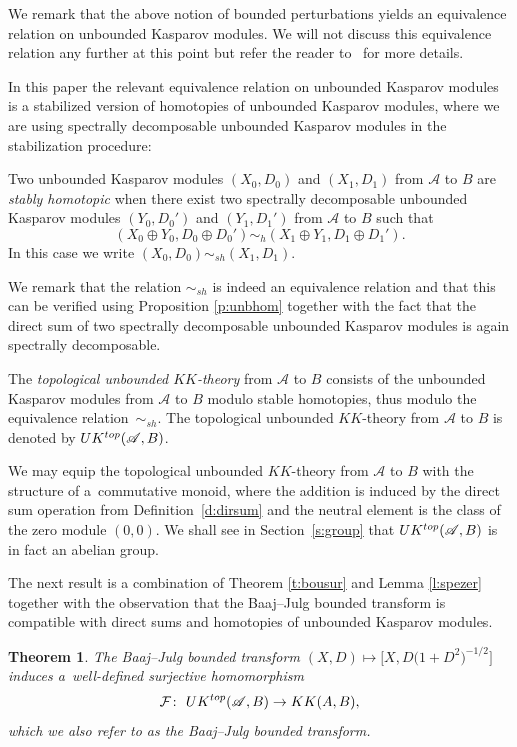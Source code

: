 \documentclass[11pt]{article}
\numberwithin{equation}{section}
\newtheorem{Theorem}{Theorem}[section]
\newcommand{\op}{\oplus}
\newcommand{\C}[1]{\mathcal{#1}}
\newcommand{\s}[1]{\mathscr{#1}}
\begin{document}
We remark that the above notion of bounded perturbations yields an equivalence relation on unbounded Kasparov modules. We will not discuss this equivalence relation any further at this point but refer the reader to~\cite{Kaa:MEU} for more details.

In this paper the relevant equivalence relation on unbounded Kasparov modules is a stabilized version of homotopies of unbounded Kasparov modules, where we are using spectrally decomposable unbounded Kasparov modules in the stabilization procedure:

\begin{dfn}
Two unbounded Kasparov modules $(X_0,D_0)$ and $(X_1,D_1)$ from $\s A$ to $B$ are \emph{stably homotopic} when there exist two spectrally decomposable unbounded Kasparov modules $(Y_0,D_0')$ and $(Y_1,D_1')$ from $\s A$ to $B$ such that
\[
(X_0 \op Y_0,D_0 \op D_0') \sim_h (X_1 \op Y_1, D_1 \op D_1') .
\]
In this case we write $(X_0,D_0) \sim_{sh} (X_1,D_1)$.
\end{dfn}

We remark that the relation $\sim_{sh}$ is indeed an equivalence relation and that this can be verified using Proposition \ref{p:unbhom} together with the fact that the direct sum of two spectrally decomposable unbounded Kasparov modules is again spectrally decomposable.

\begin{dfn}
The \emph{topological unbounded $KK$-theory} from $\s A$ to $B$ consists of the unbounded Kasparov modules from $\s A$ to $B$ modulo stable homotopies, thus modulo the equivalence relation~$\sim_{sh}$. The topological unbounded $KK$-theory from $\s A$ to $B$ is denoted by $UK^{{\rm top}}(\s A, B)$.
\end{dfn}

We may equip the topological unbounded $KK$-theory from $\s A$ to $B$ with the structure of a~commutative monoid, where the addition is induced by the direct sum operation from Definition~\ref{d:dirsum} and the neutral element is the class of the zero module $(0,0)$. We shall see in Section~\ref{s:group} that $UK^{{\rm top}}(\s A,B)$ is in fact an abelian group.

The next result is a combination of Theorem \ref{t:bousur} and Lemma \ref{l:spezer} together with the observation that the Baaj--Julg bounded transform is compatible with direct sums and homotopies of unbounded Kasparov modules.

\begin{Theorem}\label{t:baajul}
The Baaj--Julg bounded transform $(X,D) \mapsto \big[ X, D\big(1 + D^2\big)^{-1/2}\big]$ induces a~well-defined surjective homomorphism
\[
\C F\colon \ UK^{{\rm top}}(\s A, B) \to KK(A,B) ,
\]
which we also refer to as the Baaj--Julg bounded transform.
\end{Theorem}
\end{document}
